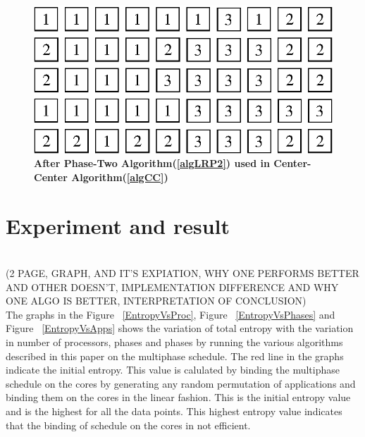 \documentclass[10pt, conference]{IEEEtran}
\begin{document}
\begin{figure} [tb]
\centering
\includegraphics[scale=0.45]{figure/phase_two_center_center.eps}
\caption{\textbf{After Phase-Two Algorithm(\ref{algLRP2}) used in Center-Center Algorithm(\ref{algCC}) }}
\label{imgCCP2}
\end{figure}
\fi

\section{Experiment and result}

\ \\ 
(2 PAGE, GRAPH, AND IT'S EXPIATION, WHY ONE PERFORMS BETTER AND OTHER DOESN'T, IMPLEMENTATION DIFFERENCE AND WHY ONE ALGO IS BETTER, INTERPRETATION OF CONCLUSION) \ \\
The graphs in the Figure ~\ref{EntropyVsProc}, Figure ~\ref{EntropyVsPhases} and Figure ~\ref{EntropyVsApps} shows the variation of total entropy with the variation in number of processors, phases and phases by running the various algorithms described in this paper on the multiphase schedule. The red line in the graphs indicate the initial entropy. This value is calulated by binding the multiphase schedule on the cores by generating any random permutation of applications and binding them on the cores in the linear fashion. This is the initial entropy value and is the highest for all the data points. This highest entropy value indicates that the binding of schedule on the cores in not efficient. \ \\
\end{document}
